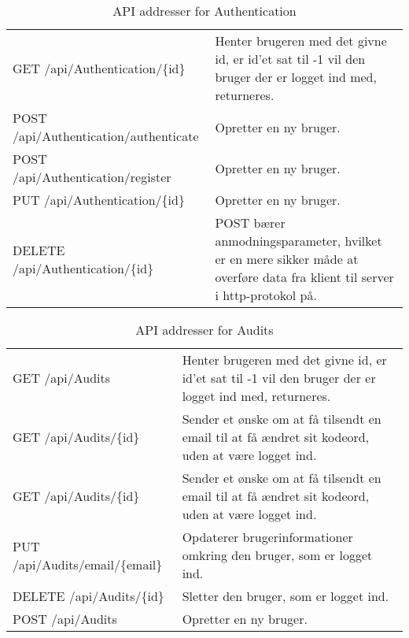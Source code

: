 \begin{table}[H]
	\centering
	\caption{API addresser for Authentication}
	\label{tab:web_user}
	\begin{tabular}{|L{0.3\textwidth}|L{0.70\textwidth}|}
		\hline
		\\
		\hline
		GET \newline
		/api/Authentication/\{id\} &
		Henter brugeren med det givne id, er id'et sat til -1 vil den bruger der er logget ind med, returneres. \\
		\hline
		POST \newline
		/api/Authentication/authenticate &
		Opretter en ny bruger. \\
        \hline
        POST \newline
		/api/Authentication/register &
		Opretter en ny bruger. \\
        \hline
        PUT \newline
		/api/Authentication/\{id\} &
		Opretter en ny bruger. \\
		\hline
		DELETE \newline
		/api/Authentication/\{id\} &
		POST bærer anmodningsparameter, hvilket er en mere sikker måde at overføre data fra klient til server i http-protokol på. \\
		\hline
	\end{tabular}
\end{table}

\begin{table}[H]
	\centering
	\caption{API addresser for Audits}
	\label{tab:web_user}
	\begin{tabular}{|L{0.3\textwidth}|L{0.70\textwidth}|}
		\hline
		\\
		\hline
		GET \newline
		/api/Audits &
		Henter brugeren med det givne id, er id'et sat til -1 vil den bruger der er logget ind med, returneres. \\
        \hline
        GET \newline
		/api/Audits/\{id\} &
		Sender et ønske om at få tilsendt en email til at få ændret sit kodeord, uden at være logget ind. 
		\\
        \hline
        GET \newline
		/api/Audits/\{id\} &
		Sender et ønske om at få tilsendt en email til at få ændret sit kodeord, uden at være logget ind. 
		\\
		\hline
		PUT \newline
		/api/Audits/email/\{email\} &
		Opdaterer brugerinformationer omkring den bruger, som er logget ind. \\
		\hline
		DELETE \newline
		/api/Audits/\{id\} &
		Sletter den bruger, som er logget ind. \\
		\hline
		POST \newline
		/api/Audits &
		Opretter en ny bruger. \\
		\hline
		
	\end{tabular}
\end{table}

